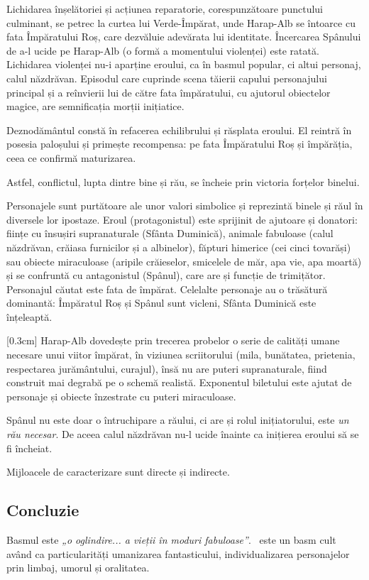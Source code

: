 Lichidarea înșelătoriei și acțiunea reparatorie, corespunzătoare punctului culminant, se petrec la curtea lui Verde-Împărat, unde Harap-Alb se întoarce cu fata Împăratului Roș, care dezvăluie adevărata lui identitate. Încercarea Spânului de a-l ucide pe Harap-Alb (o formă a momentului violenței) este ratată. Lichidarea violenței nu-i aparține eroului, ca în basmul popular, ci altui personaj, calul năzdrăvan. Episodul care cuprinde scena tăierii capului personajului principal și a reînvierii lui de către fata împăratului, cu ajutorul obiectelor magice, are semnificația morții inițiatice.

Deznodământul constă în refacerea echilibrului și răsplata eroului. El reintră în posesia paloșului și primește recompensa: pe fata Împăratului Roș și împărăția, ceea ce confirmă maturizarea.

Astfel, conflictul, lupta dintre bine și rău, se încheie prin victoria forțelor binelui.

Personajele sunt purtătoare ale unor valori simbolice și reprezintă binele și răul în diversele lor ipostaze. Eroul (protagonistul) este sprijinit de ajutoare și donatori: ființe cu însușiri supranaturale (Sfânta Duminică), animale fabuloase (calul năzdrăvan, crăiasa furnicilor și a albinelor), făpturi himerice (cei cinci tovarăși) sau obiecte miraculoase (aripile crăieselor, smicelele de măr, apa vie, apa moartă) și se confruntă cu antagonistul (Spânul), care are și funcție de trimițător. Personajul căutat este fata de împărat. Celelalte personaje au o trăsătură dominantă: Împăratul Roș și Spânul sunt vicleni, Sfânta Duminică este înțeleaptă.

[0.3cm]
Harap-Alb dovedește prin trecerea probelor o serie de calități umane necesare unui viitor împărat, în viziunea scriitorului (mila, bunătatea, prietenia, respectarea jurământului, curajul), însă nu are puteri supranaturale, fiind construit mai degrabă pe o schemă realistă. Exponentul biletului este ajutat de personaje și obiecte înzestrate cu puteri miraculoase.

Spânul nu este doar o întruchipare a răului, ci are și rolul inițiatorului, este \textit{un rău necesar}. De aceea calul năzdrăvan nu-l ucide înainte ca inițierea eroului să se fi încheiat.

Mijloacele de caracterizare sunt directe și indirecte.


\subsection{Concluzie}

Basmul este \textit{„o oglindire... a vieții în moduri fabuloase”}. \operatitle\ este un basm cult având ca particularități umanizarea fantasticului, individualizarea personajelor prin limbaj, umorul și oralitatea.
%
